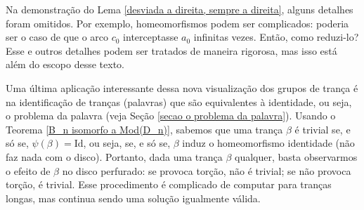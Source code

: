 	\begin{remark}
		Na demonstração do Lema \ref{desviada a direita, sempre a direita}, alguns detalhes 
		foram omitidos. Por exemplo, homeomorfismos podem ser complicados: poderia ser o caso 
		de que o arco $c_0$ interceptasse $a_0$ infinitas vezes. Então, como reduzi-lo? 
		Esse e outros detalhes podem ser tratados de maneira rigorosa, mas isso está além do 
		escopo desse texto.
	\end{remark}
	Uma última aplicação interessante dessa nova visualização dos grupos de trança é na 
	identificação de tranças (palavras) que são equivalentes à identidade, ou seja, o 
	problema da palavra (veja Seção \ref{secao o problema da palavra}). Usando o 
	Teorema \ref{B_n isomorfo a Mod(D_n)}, sabemos que uma trança $\beta$ é trivial se, 
	e só se, $\psi(\beta) = \text{Id}$, ou seja, se, e só se, $\beta$ induz o homeomorfismo 
	identidade (não faz nada com o disco). Portanto, dada uma trança $\beta$ qualquer, basta 
	observarmos o efeito de $\beta$ no disco perfurado: se provoca torção, não é trivial; se 
	não provoca torção, é trivial. Esse procedimento é complicado de computar para tranças longas, 
	mas continua sendo uma solução igualmente válida.